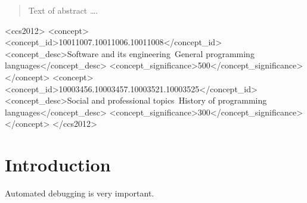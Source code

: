 \documentclass[sigplan,10pt,review,anonymous]{acmart}\settopmatter{printfolios=true,printccs=false,printacmref=false}
\begin{document}
\begin{abstract}
Text of abstract \ldots.
\end{abstract}


\begin{CCSXML}
<ccs2012>
<concept>
<concept_id>10011007.10011006.10011008</concept_id>
<concept_desc>Software and its engineering~General programming languages</concept_desc>
<concept_significance>500</concept_significance>
</concept>
<concept>
<concept_id>10003456.10003457.10003521.10003525</concept_id>
<concept_desc>Social and professional topics~History of programming languages</concept_desc>
<concept_significance>300</concept_significance>
</concept>
</ccs2012>
\end{CCSXML}





\maketitle

\section{Introduction}

Automated debugging is very important.
\end{document}
